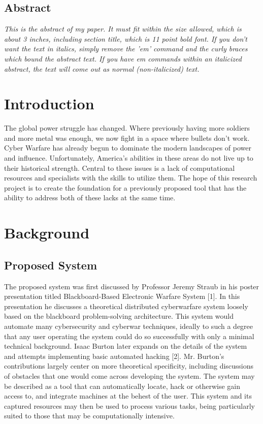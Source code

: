 \subsection*{\centering Abstract}
{\em
This is the abstract of my paper.  It must fit within the
size allowed, which is about 3 inches, including section
title, which is 11 point bold font.  If you don't want
the text in italics, simply remove the 'em' command and
the curly braces which bound the abstract text.  If you
have em commands within an italicized abstract, the text
will come out as normal (non-italicized) text.
}
\section{Introduction}
The global power struggle has changed. Where previously having more soldiers and more metal was enough, we now fight in a space where bullets don't work. Cyber Warfare has already begun to dominate the modern landscapes of power and influence. Unfortunately, America's abilities in these areas do not live up to their historical strength. Central to these issues is a lack of computational resources and specialists with the skills to utilize them. The hope of this research project is to create the foundation for a previously proposed tool that has the ability to address both of these lacks at the same time.

\section{Background}
\subsection{Proposed System}
The proposed system was first discussed by Professor Jeremy Straub in his poster presentation titled Blackboard-Based Electronic Warfare System [1]. In this presentation he discusses a theoretical distributed cyberwarfare system loosely based on the blackboard problem-solving architecture. This system would automate many cybersecurity and cyberwar techniques, ideally to such a degree that any user operating the system could do so successfully with only a minimal technical background. Isaac Burton later expands on the details of the system and attempts implementing basic automated hacking [2]. Mr. Burton's contributions largely center on more theoretical specificity, including discussions of obstacles that one would come across developing the system. The system may be described as a tool that can automatically locate, hack or otherwise gain access to, and integrate machines at the behest of the user. This system and its captured resources may then be used to process various tasks, being particularly suited to those that may be computationally intensive.
